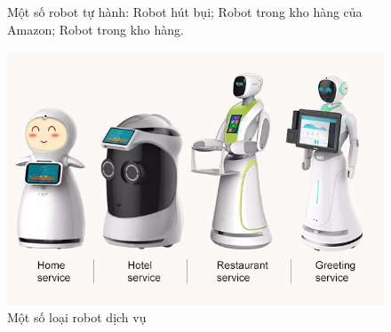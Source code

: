 \begin{figure}
	\centering
	\hspace{8pt}
	\hspace{8pt}
	\caption[]{Một số robot tự hành: Robot hút bụi;  Robot trong kho hàng của Amazon;  Robot trong kho hàng.}
	\label{fig:rb}
\end{figure}

\begin{figure}[tph]
	\centering
	\includegraphics[width=\linewidth]{chapter1/figs/someRb}
	\caption{Một số loại robot dịch vụ}
	\label{fig:somerb}
\end{figure}


